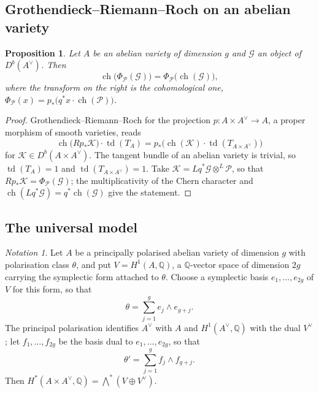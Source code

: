 \documentclass[11pt,reqno]{amsart}
\theoremstyle{plain}
\newtheorem{proposition}[theorem]{Proposition}
\theoremstyle{definition}
\theoremstyle{remark}
\newtheorem{notation}[theorem]{Notation}
\newcommand{\QQ}{\mathbb{Q}}
\newcommand{\Av}{A^{\vee}}
\newcommand{\cP}{\mathcal{P}}
\newcommand{\cG}{\mathcal{G}}
\newcommand{\cK}{\mathcal{K}}
\DeclareMathOperator{\ch}{ch}
\DeclareMathOperator{\td}{td}
\begin{document}
\subsection{Grothendieck--Riemann--Roch on an abelian variety}

\begin{proposition}\label{prop:grr}
Let $A$ be an abelian variety of dimension $g$ and $\cG$ an object of
$D^{b}(\Av)$. Then
\[
  \ch\bigl(\Phi_{\cP}(\cG)\bigr)=\Phi_{\cP}\bigl(\ch(\cG)\bigr),
\]
where the transform on the right is the cohomological one,
$\Phi_{\cP}(x)=p_{*}\bigl(q^{*}x\cdot\ch(\cP)\bigr)$.
\end{proposition}

\begin{proof}
Grothendieck--Riemann--Roch for the projection
$p\colon A\times\Av\to A$, a proper morphism of smooth varieties, reads
\[
  \ch\bigl(Rp_{*}\cK\bigr)\cdot\td(T_{A})
  =p_{*}\bigl(\ch(\cK)\cdot\td(T_{A\times\Av})\bigr)
\]
for $\cK\in D^{b}(A\times\Av)$. The tangent bundle of an abelian variety is
trivial, so $\td(T_{A})=1$ and $\td(T_{A\times\Av})=1$. Take
$\cK=Lq^{*}\cG\otimes^{L}\cP$, so that $Rp_{*}\cK=\Phi_{\cP}(\cG)$; the
multiplicativity of the Chern character and $\ch(Lq^{*}\cG)=q^{*}\ch(\cG)$
give the statement.
\end{proof}

\subsection{The universal model}

\begin{notation}\label{not:model}
Let $A$ be a principally polarised abelian variety of dimension $g$ with
polarisation class $\theta$, and put $V=H^{1}(A,\QQ)$, a $\QQ$-vector space of
dimension $2g$ carrying the symplectic form attached to $\theta$. Choose a
symplectic basis $e_{1},\dots,e_{2g}$ of $V$ for this form, so that
\begin{equation}\label{eq:thetamodel}
  \theta=\sum_{j=1}^{g}e_{j}\wedge e_{g+j}.
\end{equation}
The principal polarisation identifies $\Av$ with $A$ and
$H^{1}(\Av,\QQ)$ with the dual $V^{\vee}$; let $f_{1},\dots,f_{2g}$ be the
basis dual to $e_{1},\dots,e_{2g}$, so that
\begin{equation}\label{eq:thetapmodel}
  \theta'=\sum_{j=1}^{g}f_{j}\wedge f_{g+j}.
\end{equation}
Then $H^{*}(A\times\Av,\QQ)=\bigwedge^{*}(V\oplus V^{\vee})$.
\end{notation}
\end{document}
